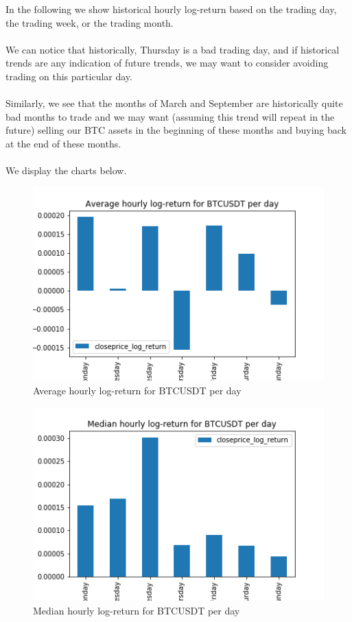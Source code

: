 \documentclass[twoside]{report}
\begin{document}
\begin{spacing}{1}
In the following we show historical hourly log-return based on the trading day, the trading week, or the trading month.
\\ \\
We can notice that historically, Thursday is a bad trading day, and if historical trends are any indication of future trends, we may want to consider avoiding trading on this particular day.
\\ \\
Similarly, we see that the months of March and September are historically quite bad months to trade and we may want (assuming this trend will repeat in the future) selling our BTC assets in the beginning of these months and buying back at the end of these months.
\\ \\
We display the charts below.
\begin{figure}[!htbp]
    \centering
    \includegraphics[scale = 0.5]{Images/Average hourly log-return for BTCUSDT per day.png}
    \caption{Average hourly log-return for BTCUSDT per day}
    \label{Average hourly log-return for BTCUSDT per day}
\end{figure}

\begin{figure}[!htbp]
    \centering
    \includegraphics[scale = 0.5]{Images/Median hourly log-return for BTCUSDT per day.png}
    \caption{Median hourly log-return for BTCUSDT per day}
    \label{Median hourly log-return for BTCUSDT per day}
\end{figure}


\end{spacing}
\end{document}
